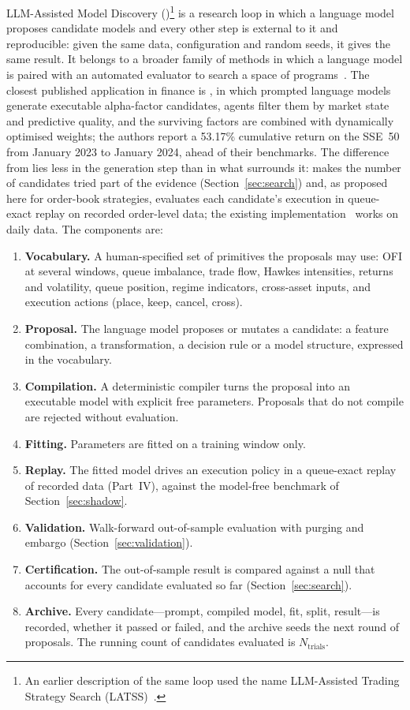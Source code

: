 LLM-Assisted Model Discovery (\lamd)\footnote{An earlier description of the same loop used the
name LLM-Assisted Trading Strategy Search (LATSS)~\citep{mayeski_latss}.} is a research loop in which a language model proposes
candidate models and every other step is external to it and reproducible: given the same data,
configuration and random seeds, it gives the same result. It belongs to a broader
family of methods in which a language model is paired with an automated evaluator to search a
space of programs~\citep{romera2024}. The closest published application in finance is
\citet{kou2025strategy}, in which prompted language models generate executable alpha-factor
candidates, agents filter them by market state and predictive quality, and the surviving factors are
combined with dynamically optimised weights; the authors report a 53.17\% cumulative return on the SSE~50
from January 2023 to January 2024, ahead of their benchmarks. The difference from
\lamd{} lies less in the generation step than in what surrounds it: \lamd{} makes the number of
candidates tried part of the evidence (Section~\ref{sec:search}) and, as proposed here for order-book
strategies, evaluates each candidate's execution in queue-exact replay on recorded order-level data; the
existing implementation~\citep{mayeski_latss} works on daily data. The components are:

\begin{enumerate}[leftmargin=1.5em]
\item \textbf{Vocabulary.} A human-specified set of primitives the proposals may use: OFI at several
  windows, queue imbalance, trade flow, Hawkes intensities, returns and volatility, queue position,
  regime indicators, cross-asset inputs, and execution actions (place, keep, cancel, cross).
\item \textbf{Proposal.} The language model proposes or mutates a candidate: a feature combination,
  a transformation, a decision rule or a model structure, expressed in the vocabulary.
\item \textbf{Compilation.} A deterministic compiler turns the proposal into an executable model
  with explicit free parameters. Proposals that do not compile are rejected without evaluation.
\item \textbf{Fitting.} Parameters are fitted on a training window only.
\item \textbf{Replay.} The fitted model drives an execution policy in a queue-exact replay of
  recorded data (Part~IV), against the model-free benchmark of Section~\ref{sec:shadow}.
\item \textbf{Validation.} Walk-forward out-of-sample evaluation with purging and embargo
  (Section~\ref{sec:validation}).
\item \textbf{Certification.} The out-of-sample result is compared against a null that accounts for
  every candidate evaluated so far (Section~\ref{sec:search}).
\item \textbf{Archive.} Every candidate---prompt, compiled model, fit, split, result---is recorded,
  whether it passed or failed, and the archive seeds the next round of proposals. The running count
  of candidates evaluated is $N_{\text{trials}}$.
\end{enumerate}

